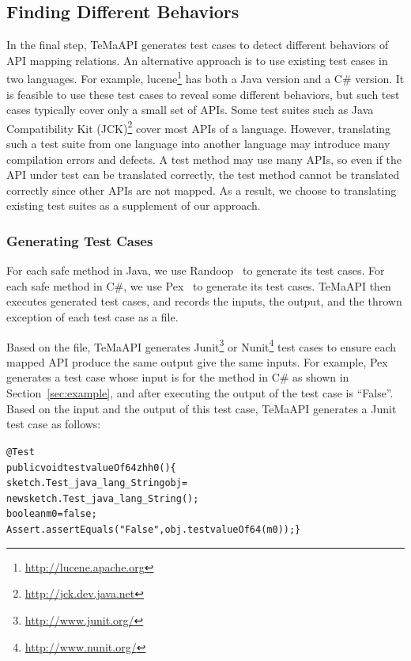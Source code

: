 \subsection{Finding Different Behaviors}
\label{sec:approach:behavior}
In the final step, TeMaAPI generates test cases to detect different behaviors of API mapping relations. An alternative approach is to use existing test cases in two languages. For example, lucene\footnote{\url{http://lucene.apache.org}} has both a Java version and a C\# version. It is feasible to use these test cases to reveal some different behaviors, but such test cases typically cover only a small set of APIs. Some test suites such as Java Compatibility Kit (JCK)\footnote{\url{http://jck.dev.java.net}} cover most APIs of a language. However, translating such a test suite from one language into another language may introduce many compilation errors and defects. A test method may use many APIs, so even if the API under test can be translated correctly, the test method cannot be translated correctly since other APIs are not mapped. As a result, we choose to translating existing test suites as a supplement of our approach.

\subsubsection{Generating Test Cases}
\label{sec:approach:behavior:generating}
For each safe method in Java, we use Randoop~\cite{pacheco2007feedback} to generate its test cases. For each safe method in C\#, we use Pex~\cite{tillmann2008pex} to generate its test cases. TeMaAPI then executes generated test cases, and records the inputs, the output, and the thrown exception of each test case as a file.

Based on the file, TeMaAPI generates Junit\footnote{\url{http://www.junit.org/}} or Nunit\footnote{\url{http://www.nunit.org/}} test cases to ensure each mapped API produce the same output give the same inputs. For example, Pex generates a test case whose input is  for the  method in C\# as shown in Section~\ref{sec:example}, and after executing the output of the test case is ``False''. Based on the input and the output of this test case, TeMaAPI generates a Junit test case as follows:

\begin{CodeOut}%
\begin{alltt}
 @Test
 public void testvalueOf64zhh0()\{
   sketch.Test_java_lang_String obj =
                       new sketch.Test_java_lang_String();
   boolean m0 = false;
   Assert.assertEquals("False", obj.testvalueOf64(m0));\}
\end{alltt}
\end{CodeOut}

